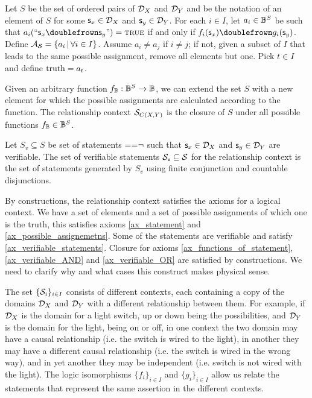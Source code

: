 \documentclass[11pt,letterpaper,fleqn]{memoir} %
\begin{document}
\begin{mathSection}
\begin{defn}
	Let $S$ be the set of ordered pairs of $\mathcal{D}_{X}$ and $\mathcal{D}_{Y}$ and  be the notation of an element of $S$ for some $\mathsf{s}_x \in \mathcal{D}_{X}$ and $\mathsf{s}_y \in \mathcal{D}_{Y}$. For each $i \in I$, let $a_i \in \mathbb{B}^S$ be such that  $a_i(``\stmt_x \comp \stmt_y") = \TRUE$ if and only if $f_{i}(\stmt_x) \comp g_{i}(\stmt_y)$. Define $\mathcal{A}_{\mathcal{S}} = \{ a_i \, | \, \forall i \in I \}$. Assume $a_i \neq a_j$ if $i \neq j$; if not, given a subset of $I$ that leads to the same possible assignment, remove all elements but one. Pick $t \in I$ and define $\operatorname{truth} = a_t$.
	
	Given an arbitrary function $f_{\mathbb{B}} : \mathbb{B}^S \to \mathbb{B}$, we can extend the set $S$ with a new element for which the possible assignments are calculated according to the function. The relationship context $\mathcal{S}_{C(X,Y)}$ is the closure of $S$ under all possible functions $f_{\mathbb{B}} \in \mathbb{B}^S$.
	
	Let $S_v \subseteq S$ be set of statements ==$\neg$ such that $\mathsf{s}_x \in \mathcal{D}_{X}$ and $\mathsf{s}_y \in \mathcal{D}_{Y}$ are verifiable. The set of verifiable statements $\mathcal{S}_\textsf{v} \subseteq \mathcal{S}$ for the relationship context is the set of statements generated by $S_v$ using finite conjunction and countable disjunctions.
\end{defn}
\begin{justification}
	By constructions, the relationship context satisfies the axioms for a logical context. We have a set of elements and a set of possible assignments of which one is the truth, this satisfies axioms \ref{ax_statement} and \ref{ax_possible_assignemetns}. Some of the statements are verifiable and satisfy \ref{ax_verifiable_statements}. Closure for axioms \ref{ax_functions_of_statement}, \ref{ax_verifiable_AND} and \ref{ax_verifiable_OR} are satisfied by constructions. We need to clarify why and what cases this construct makes physical sense.
	
	The set $\{ \mathcal{S}_i \}_{i \in I}$ consists of different contexts, each containing a copy of the domains $\mathcal{D}_X$ and $\mathcal{D}_Y$ with a different relationship between them. For example, if $\mathcal{D}_X$ is the domain for a light switch, up or down being the possibilities, and $\mathcal{D}_Y$ is the domain for the light, being on or off, in one context the two domain may have a causal relationship (i.e. the switch is wired to the light), in another they may have a different causal relationship (i.e. the switch is wired in the wrong way), and in yet another they may be independent (i.e. switch is not wired with the light). The logic isomorphisms $\{f_{i}\}_{i \in I}$ and $\{g_{i}\}_{i \in I}$ allow us relate the statements that represent the same  assertion in the different contexts.
	

\end{justification}
\end{mathSection}
\end{document}
